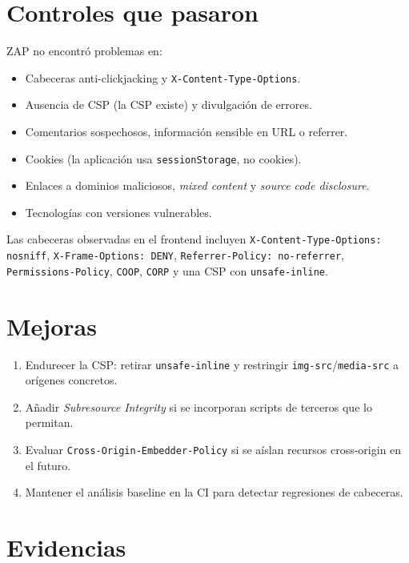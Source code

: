 \documentclass[11pt]{article}
\begin{document}
\section{Controles que pasaron}

ZAP no encontró problemas en:

\begin{itemize}
  \item Cabeceras anti-clickjacking y \texttt{X-Content-Type-Options}.
  \item Ausencia de CSP (la CSP existe) y divulgación de errores.
  \item Comentarios sospechosos, información sensible en URL o referrer.
  \item Cookies (la aplicación usa \texttt{sessionStorage}, no cookies).
  \item Enlaces a dominios maliciosos, \textit{mixed content} y
  \textit{source code disclosure}.
  \item Tecnologías con versiones vulnerables.
\end{itemize}

Las cabeceras observadas en el frontend incluyen
\texttt{X-Content-Type-Options: nosniff}, \texttt{X-Frame-Options: DENY},
\texttt{Referrer-Policy: no-referrer}, \texttt{Permissions-Policy},
\texttt{COOP}, \texttt{CORP} y una CSP con \texttt{unsafe-inline}.

\section{Mejoras}

\begin{enumerate}
  \item Endurecer la CSP: retirar \texttt{unsafe-inline} y restringir
  \texttt{img-src}/\texttt{media-src} a orígenes concretos.
  \item Añadir \textit{Subresource Integrity} si se incorporan scripts de
  terceros que lo permitan.
  \item Evaluar \texttt{Cross-Origin-Embedder-Policy} si se aíslan recursos
  cross-origin en el futuro.
  \item Mantener el análisis baseline en la CI para detectar regresiones de
  cabeceras.
\end{enumerate}

\section{Evidencias}
\end{document}
